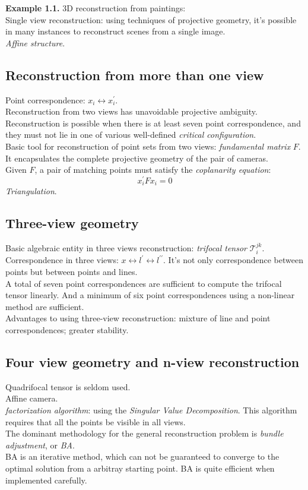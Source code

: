 \documentclass[12pt]{article}
\begin{document}
\noindent \textbf{Example 1.1.} 3D reconstruction from paintings: \\
Single view reconstruction: using techniques of projective geometry, it's possible in many instances to reconstruct 
scenes from a single image. \\
\textit{Affine structure}. \\

\subsection{Reconstruction from more than one view}
Point correspondence: $ x_i \leftrightarrow x_i^\prime $. \\
Reconstruction from two views has unavoidable projective ambiguity. \\
Reconstruction is possible when there is at least seven point correspondence, and they must not 
lie in one of various well-defined \textit{critical configuration}. \\
Basic tool for reconstruction of point sets from two views: \textit{fundamental matrix} $F$.
It encapsulates the complete projective geometry of the pair of cameras. \\
Given $F$, a pair of matching points must satisfy the \textit{coplanarity equation}:
$$ x_i^\prime F x_i = 0 $$ 
\textit{Triangulation}. \\

\subsection{Three-view geometry}
Basic algebraic entity in three views reconstruction: \textit{trifocal tensor} $ \mathcal{T}_i^{jk} $. \\
Correspondence in three views: $ x \leftrightarrow l^\prime \leftrightarrow l^{\prime\prime} $.
It's not only correspondence between points but between points and lines. \\
A total of seven point correspondences are sufficient to compute the trifocal tensor linearly. And a minimum
of six point correspondences using a non-linear method are sufficient. \\
Advantages to using three-view reconstruction: mixture of line and point correspondences; greater stability. \\

\subsection{Four view geometry and n-view reconstruction}
Quadrifocal tensor is seldom used. \\
Affine camera. \\
\textit{factorization algorithm}: using the \textit{Singular Value Decomposition}.
This algorithm requires that all the points be visible in all views. \\
The dominant methodology for the general reconstruction problem is \textit{bundle adjustment}, or \textit{BA}. \\
BA is an iterative method, which can not be guaranteed to converge to the optimal solution from a arbitray starting point.
BA is quite efficient when implemented carefully. \\
\end{document}
